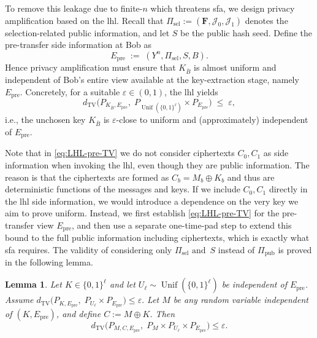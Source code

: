 \documentclass[onecolumn]{IEEEtran} %
\newcommand{\bF}{\mathbf F}
\newcommand{\1}{\mathbbm{1}}
\theoremstyle{boldremark}
\newtheorem{lemma}{Lemma}
\DeclareMathOperator{\Unif}{Unif}
\begin{document}
To remove this leakage due to finite-$n$ which threatens \gls{sfa}, we design privacy amplification based on the \gls{lhl}.
Recall that $\Pi_{\mathrm{sel}}:=(\bF,\mathcal J_0,\mathcal J_1)$ denotes the selection-related public information,
and let $S$ be the public hash seed. Define the pre-transfer side information at Bob as
\[
E_{\mathrm{pre}} \;:=\; (Y^n,\Pi_{\mathrm{sel}},S,B).
\]
Hence privacy amplification must ensure that $K_{\bar B}$ is almost uniform and independent of Bob's entire view
available at the key-extraction stage, namely $E_{\mathrm{pre}}$. Concretely, for a suitable $\varepsilon\in(0,1)$,
the \gls{lhl} yields
\begin{equation}\label{eq:LHL-pre-TV}
  d_{\mathrm{TV}}\!\Big(P_{K_{\bar B},E_{\mathrm{pre}}},\; P_{\Unif(\{0,1\}^\ell)}\times P_{E_{\mathrm{pre}}}\Big)
  \;\le\; \varepsilon,
\end{equation}
i.e., the unchosen key $K_{\bar B}$ is $\varepsilon$-close to uniform and (approximately) independent of $E_{\mathrm{pre}}$.

Note that in \eqref{eq:LHL-pre-TV} we do not consider ciphertexts $C_0,C_1$ as side information when invoking the
\gls{lhl}, even though they are public information. The reason is that the ciphertexts are formed as
$C_b=M_b\oplus K_b$ and thus are deterministic functions of the messages and keys. If we include $C_0,C_1$
directly in the \gls{lhl} side information, we would introduce a dependence on the very key we aim to prove
uniform.
Instead, we first establish \eqref{eq:LHL-pre-TV} for the pre-transfer view $E_{\mathrm{pre}}$, and then use a
separate one-time-pad  step to extend this bound to the full public information including ciphertexts,
which is exactly what \gls{sfa} requires. The validity of considering only $\Pi_{\mathrm{sel}}\mbox{ and }\,S$ instead of
$\Pi_{\mathrm{pub}}$ is proved in the following lemma.


\begin{lemma}\label{lem:lhl-lift-coupling}
Let $K\in\{0,1\}^\ell$ and let
$U_\ell\sim\Unif(\{0,1\}^\ell)$ be independent of $E_{\mathrm{pre}}$.
Assume $d_{\mathrm{TV}}\!\Big(P_{K,E_{\mathrm{pre}}},\; P_{U_\ell}\times P_{E_{\mathrm{pre}}}\Big)\le\varepsilon.$
Let $M$ be any random variable independent of $(K,E_{\mathrm{pre}})$, and define $C:=M\oplus K$.
Then
\begin{equation}\label{eq:MCE-close}
d_{\mathrm{TV}}\!\Big(P_{M,C,E_{\mathrm{pre}}},\; P_M\times P_{U_\ell}\times P_{E_{\mathrm{pre}}}\Big)\le\varepsilon .
\end{equation}
\end{lemma}
\end{document}
